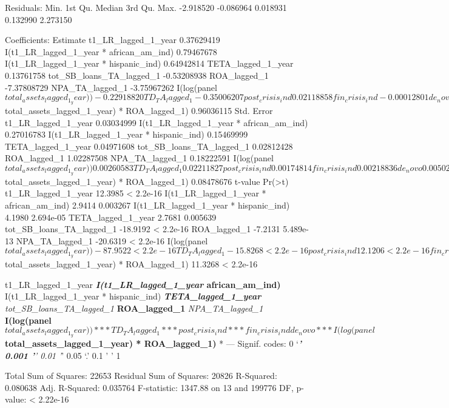 \documentclass[]{article}
\begin{document}
Residuals: Min. 1st Qu. Median 3rd Qu. Max. -2.918520 -0.086964 0.018931
0.132990 2.273150

Coefficients: Estimate t1\_LR\_lagged\_1\_year 0.37629419
I(t1\_LR\_lagged\_1\_year * african\_am\_ind) 0.79467678
I(t1\_LR\_lagged\_1\_year * hispanic\_ind) 0.64942814
TETA\_lagged\_1\_year 0.13761758 tot\_SB\_loans\_TA\_lagged\_1
-0.53208938 ROA\_lagged\_1 -7.37808729 NPA\_TA\_lagged\_1 -3.75967262
I(log(panel\(total_assets_lagged_1_year)) -0.22918820 TD_TA_lagged_1 -0.35006207 post_crisis_ind 0.02118858 fin_crisis_ind -0.00012801 de_novo 0.21704108 I(log(panel\)total\_assets\_lagged\_1\_year)
* ROA\_lagged\_1) 0.96036115 Std. Error t1\_LR\_lagged\_1\_year
0.03034999 I(t1\_LR\_lagged\_1\_year * african\_am\_ind) 0.27016783
I(t1\_LR\_lagged\_1\_year * hispanic\_ind) 0.15469999
TETA\_lagged\_1\_year 0.04971608 tot\_SB\_loans\_TA\_lagged\_1
0.02812428 ROA\_lagged\_1 1.02287508 NPA\_TA\_lagged\_1 0.18222591
I(log(panel\(total_assets_lagged_1_year)) 0.00260583 TD_TA_lagged_1 0.02211827 post_crisis_ind 0.00174814 fin_crisis_ind 0.00218836 de_novo 0.00502193 I(log(panel\)total\_assets\_lagged\_1\_year)
* ROA\_lagged\_1) 0.08478676 t-value
Pr(\textgreater{}\textbar{}t\textbar{}) t1\_LR\_lagged\_1\_year 12.3985
\textless{} 2.2e-16 I(t1\_LR\_lagged\_1\_year * african\_am\_ind) 2.9414
0.003267 I(t1\_LR\_lagged\_1\_year * hispanic\_ind) 4.1980 2.694e-05
TETA\_lagged\_1\_year 2.7681 0.005639 tot\_SB\_loans\_TA\_lagged\_1
-18.9192 \textless{} 2.2e-16 ROA\_lagged\_1 -7.2131 5.489e-13
NPA\_TA\_lagged\_1 -20.6319 \textless{} 2.2e-16
I(log(panel\(total_assets_lagged_1_year)) -87.9522 < 2.2e-16 TD_TA_lagged_1 -15.8268 < 2.2e-16 post_crisis_ind 12.1206 < 2.2e-16 fin_crisis_ind -0.0585 0.953353 de_novo 43.2187 < 2.2e-16 I(log(panel\)total\_assets\_lagged\_1\_year)
* ROA\_lagged\_1) 11.3268 \textless{} 2.2e-16

t1\_LR\_lagged\_1\_year \textbf{\emph{ I(t1\_LR\_lagged\_1\_year }
african\_am\_ind) } I(t1\_LR\_lagged\_1\_year * hispanic\_ind)
\emph{\textbf{ TETA\_lagged\_1\_year } tot\_SB\_loans\_TA\_lagged\_1
}\textbf{ ROA\_lagged\_1 }\emph{ NPA\_TA\_lagged\_1 }\textbf{
I(log(panel\(total_assets_lagged_1_year)) *** TD_TA_lagged_1 *** post_crisis_ind *** fin_crisis_ind de_novo *** I(log(panel\)total\_assets\_lagged\_1\_year)
* ROA\_lagged\_1) }* --- Signif. codes: 0 `\emph{\textbf{' 0.001 '}'
0.01 '}' 0.05 `.' 0.1 ' ' 1

Total Sum of Squares: 22653 Residual Sum of Squares: 20826 R-Squared:
0.080638 Adj. R-Squared: 0.035764 F-statistic: 1347.88 on 13 and 199776
DF, p-value: \textless{} 2.22e-16
\end{document}
